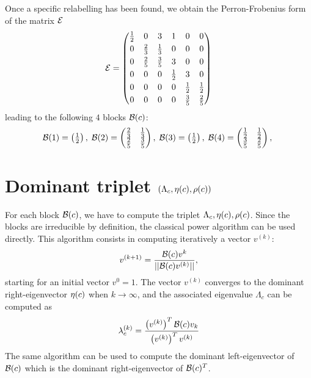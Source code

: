 \documentclass{article}
\begin{document}
%
Once a specific relabelling has been found, we obtain the Perron-Frobenius form of the matrix $\mathcal{E}$
\begin{equation}
\mathcal{E} = \begin{pmatrix}
\frac{1}{2}& 0& 3& 1& 0& 0\\[0.1cm]
0& \frac{2}{3}& \frac{1}{3}& 0& 0& 0\\[0.1cm]
0& \frac{2}{5}& \frac{3}{5}& 3& 0& 0\\[0.1cm]
0& 0& 0& \frac{1}{2}& 3& 0\\[0.1cm]
0& 0& 0& 0& \frac{1}{2}& \frac{1}{2}\\[0.1cm]
0& 0& 0& 0& \frac{3}{5}& \frac{2}{5}
\end{pmatrix}
\end{equation}
leading to the following $4$ blocks $\mathcal B(c)$: %
\begin{equation}
 \mathcal B(1) = \begin{pmatrix}
\frac{1}{2}
\end{pmatrix},\;  \mathcal B(2) = \begin{pmatrix}
\frac{2}{3}& \frac{1}{3}\\
\frac{2}{5}& \frac{3}{5}
\end{pmatrix},\;  \mathcal B(3) = \begin{pmatrix}
\frac{1}{2}
\end{pmatrix},\;  \mathcal B(4) = \begin{pmatrix}
\frac{1}{2}& \frac{1}{2}\\
\frac{3}{5}& \frac{2}{5}
\end{pmatrix},\; 
\end{equation}

\section{ Dominant triplet $\left(\Lambda _c, \eta(c), \rho(c)\right)$}
For each block $\mathcal B(c)$, we have to compute the triplet $\Lambda _c, \eta(c), \rho(c)$.
Since the blocks are irreducible by definition, the classical power algorithm
can be used directly. This algorithm consists in computing iteratively a vector $v^{(k)}$:
\begin{equation}
v^{(k+1)} = \frac{ \mathcal B(c) v^{k} } {|| \mathcal B(c) v^{(k)}||},
\end{equation}
starting for an initial vector $v^{0}=1$.
The vector $v^{(k)}$ converges to the dominant right-eigenvector $\eta(c)$ when $k \rightarrow \infty$, and the associated eigenvalue $\Lambda _c$ can be computed as
\begin{equation}
\lambda_c^{(k)} =  \frac{ \left(v^{(k)}\right)^T \mathcal B(c) v_k } { \left(v^{(k)}\right)^T v^{(k)} } 
\end{equation}
The same algorithm can be used to compute the dominant left-eigenvector of $\mathcal B(c)$
which is the dominant right-eigenvector of $\mathcal B(c)^T$.
\end{document}

